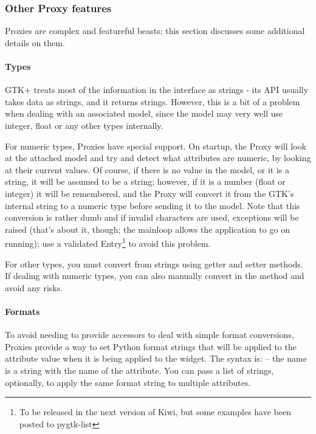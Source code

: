 \documentclass[a4paper]{howto}
\begin{document}
\subsubsection{Other Proxy features}

Proxies are complex and featureful beasts; this section discusses some
additional details on them.

\paragraph{Types}

GTK+ treats most of the information in the interface as strings - its
API usually takes data as strings, and it returns strings. However, this
is a bit of a problem when dealing with an associated model, since the
model may very well use integer, float or any other types internally.

For numeric types, Proxies have special support. On startup, the Proxy
will look at the attached model and try and detect what attributes are
numeric, by looking at their current values. Of course, if there is no
value in the model, or it is a string, it will be assumed to be a
string; however, if it is a number (float or integer) it will be
remembered, and the Proxy will convert it from the GTK's internal string
to a numeric type before sending it to the model. Note that this
conversion is rather dumb and if invalid characters are used, exceptions
will be raised (that's about it, though; the mainloop allows the
application to go on running); use a validated Entry\footnote{To be
released in the next version of Kiwi, but some examples have been posted
to pygtk-list} to avoid this problem.

For other types, you must convert from strings using getter and setter
methods. If dealing with numeric types, you can also manually convert in
the  method and avoid any risks.

\paragraph{Formats}
\label{formats}

To avoid needing to provide accessors to deal with simple format
conversions, Proxies provide a way to set Python format strings that
will be applied to the attribute value when it is being applied to the
widget. The syntax is:  -- the name is a string with the name of the
attribute. You can pass a list of strings, optionally, to apply the same
format string to multiple attributes.
\end{document}
